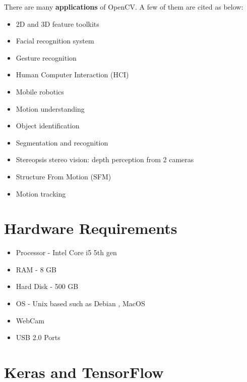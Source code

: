 There are many \textbf{applications} of OpenCV. A few of them are cited as below:
\begin{itemize}
\item 2D and 3D feature toolkits 
\item Facial recognition system 
\item Gesture recognition 
\item Human Computer Interaction (HCI) 
\item Mobile robotics 
\item Motion understanding 
\item Object identification 
\item Segmentation and recognition 
\item Stereopsis stereo vision: depth perception from 2 cameras 
\item Structure From Motion (SFM) 
\item Motion tracking 
\end{itemize}
\section{Hardware Requirements}
\begin{itemize}
	\item Processor - Intel Core i5 5th gen
	\item RAM - 8 GB
	\item Hard Disk - 500 GB
	\item OS - Unix based such as Debian , MacOS
	\item WebCam
	\item USB 2.0 Ports
\end{itemize}
\section{Keras and TensorFlow}
